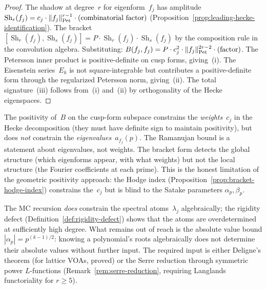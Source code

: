 \begin{proof}
The shadow at degree~$r$ for eigenform~$f_j$ has amplitude
$\operatorname{Sh}_r(f_j) = c_j \cdot \lVert f_j
\rVert_{\mathrm{Pet}}^{r-1} \cdot \textup{(combinatorial
factor)}$
(Proposition~\ref{prop:leading-hecke-identification}).
The bracket $[\operatorname{Sh}_r(f_j),
\operatorname{Sh}_s(f_j)] = P \cdot
\operatorname{Sh}_r(f_j) \cdot \operatorname{Sh}_s(f_j)$
by the composition rule in the convolution algebra.
Substituting:
$B(f_j, f_j) = P \cdot c_j^2 \cdot
\lVert f_j \rVert_{\mathrm{Pet}}^{2r-2} \cdot
\textup{(factor)}$.
The Petersson inner product is positive-definite on cusp
forms, giving~(i). The Eisenstein series~$E_k$ is not
square-integrable but contributes a positive-definite form
through the regularized Petersson norm, giving~(ii).
The total signature~(iii) follows from~(i) and~(ii) by
orthogonality of the Hecke eigenspaces.
\end{proof}

\begin{remark}%
\label{rem:positivity-limitation}%
%
The positivity of~$B$ on the cusp-form subspace constrains the
\emph{weights}~$c_j$ in the Hecke decomposition (they must
have definite sign to maintain positivity), but does
\emph{not} constrain the \emph{eigenvalues}~$a_{f_j}(p)$.
The Ramanujan bound is a statement about eigenvalues, not
weights. The bracket form detects the global structure
(which eigenforms appear, with what weights) but not the
local structure (the Fourier coefficients at each prime).
This is the honest limitation of the geometric positivity
approach: the Hodge index
(Proposition~\ref{prop:bracket-hodge-index}) constrains
the~$c_j$ but is blind to the Satake parameters
$\alpha_p, \beta_p$.

The MC recursion \emph{does} constrain the spectral
atoms~$\lambda_j$ algebraically; the rigidity defect
(Definition~\ref{def:rigidity-defect}) shows that the
atoms are overdetermined at sufficiently high degree.
What remains out of reach is the absolute value bound
$|\alpha_p| = p^{(k-1)/2}$: knowing a polynomial's
roots algebraically does not determine their absolute
values without further input. The required input is
either Deligne's theorem (for lattice VOAs, proved) or
the Serre reduction through symmetric power $L$-functions
(Remark~\ref{rem:serre-reduction}, requiring
Langlands functoriality for $r \geq 5$).
\end{remark}

